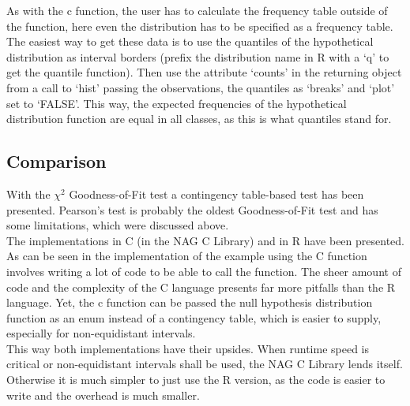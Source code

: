 \documentclass{article}
\theoremstyle{definition}
\begin{document}
As with the c function, the user has to calculate the frequency table outside of the function, here even the distribution has to be specified as a frequency table.
The easiest way to get these data is to use the  quantiles of the hypothetical distribution as interval borders (prefix the distribution name in R with a `q' to get the quantile function).
Then use the attribute `counts' in the returning object from a call to `hist' passing the observations, the quantiles as `breaks' and `plot' set to `FALSE'.
This way, the expected frequencies of the hypothetical distribution function are equal in all classes, as this is what quantiles stand for.

\subsection{Comparison}
With the $\chi^2$ Goodness-of-Fit test a contingency table-based test has been presented.
Pearson's test is probably the oldest Goodness-of-Fit test and has some limitations, which were discussed above.
\\
The implementations in C (in the NAG C Library) and in R have been presented.
As can be seen in the implementation of the example using the C function involves writing a lot of code to be able to call the function.
The sheer amount of code and the complexity of the C language presents far more pitfalls than the R language.
Yet, the c function can be passed the null hypothesis distribution function as an enum instead of a contingency table, which is easier to supply, especially for non-equidistant intervals.
\\
This way both implementations have their upsides.
When runtime speed is critical or non-equidistant intervals shall be used, the NAG C Library lends itself.
Otherwise it is much simpler to just use the R version, as the code is easier to write and the overhead is much smaller.
\end{document}

